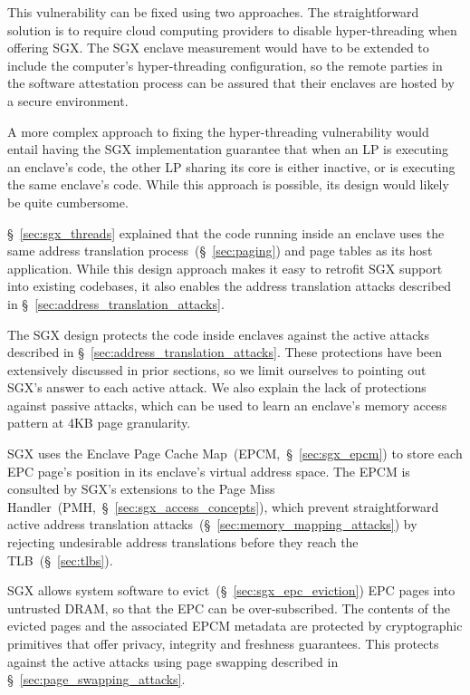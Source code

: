 This vulnerability can be fixed using two approaches. The straightforward
solution is to require cloud computing providers to disable hyper-threading
when offering SGX. The SGX enclave measurement would have to be extended to
include the computer's hyper-threading configuration, so the remote parties in
the software attestation process can be assured that their enclaves are hosted
by a secure environment.

A more complex approach to fixing the hyper-threading vulnerability would
entail having the SGX implementation guarantee that when an LP is executing an
enclave's code, the other LP sharing its core is either inactive, or is
executing the same enclave's code. While this approach is possible, its design
would likely be quite cumbersome.


\label{sec:sgx_vs_memory_mapping_attacks}

\S~\ref{sec:sgx_threads} explained that the code running inside an enclave uses
the same address translation process~(\S~\ref{sec:paging}) and page tables as
its host application. While this design approach makes it easy to retrofit SGX
support into existing codebases, it also enables the address translation
attacks described in \S~\ref{sec:address_translation_attacks}.

The SGX design protects the code inside enclaves against the active attacks
described in \S~\ref{sec:address_translation_attacks}. These protections have
been extensively discussed in prior sections, so we limit ourselves to
pointing out SGX's answer to each active attack. We also explain the lack of
protections against passive attacks, which can be used to learn an enclave's
memory access pattern at 4KB page granularity.

SGX uses the Enclave Page Cache Map~(EPCM,~\S~\ref{sec:sgx_epcm}) to store each
EPC page's position in its enclave's virtual address space. The EPCM is
consulted by SGX's extensions to the Page Miss
Handler~(PMH,~\S~\ref{sec:sgx_access_concepts}), which prevent straightforward
active address translation attacks~(\S~\ref{sec:memory_mapping_attacks}) by
rejecting undesirable address translations before they reach the
TLB~(\S~\ref{sec:tlbs}).

SGX allows system software to evict~(\S~\ref{sec:sgx_epc_eviction}) EPC pages
into untrusted DRAM, so that the EPC can be over-subscribed. The contents of
the evicted pages and the associated EPCM metadata are protected by
cryptographic primitives that offer privacy, integrity and freshness
guarantees. This protects against the active attacks using page swapping
described in \S~\ref{sec:page_swapping_attacks}.


